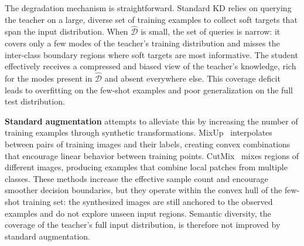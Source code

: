 \begin{foldable}
  The degradation mechanism is straightforward.
  Standard \ac{KD} relies on querying the teacher on a large, diverse set of training examples to collect soft targets that span the input distribution.
  When $\hat{\mathcal{D}}$ is small, the set of queries is narrow: it covers only a few modes of the teacher's training distribution and misses the inter-class boundary regions where soft targets are most informative.
  The student effectively receives a compressed and biased view of the teacher's knowledge, rich for the modes present in $\hat{\mathcal{D}}$ and absent everywhere else.
  This coverage deficit leads to overfitting on the few-shot examples and poor generalization on the full test distribution.
\end{foldable}

\begin{foldable}
  \textbf{Standard augmentation} attempts to alleviate this by increasing the number of training examples through synthetic transformations.
  MixUp~\cite{zhang2018mixup} interpolates between pairs of training images and their labels, creating convex combinations that encourage linear behavior between training points.
  CutMix~\cite{yun2019cutmix} mixes regions of different images, producing examples that combine local patches from multiple classes.
  These methods increase the effective sample count and encourage smoother decision boundaries, but they operate within the convex hull of the few-shot training set: the synthesized images are still anchored to the observed examples and do not explore unseen input regions.
  Semantic diversity, the coverage of the teacher's full input distribution, is therefore not improved by standard augmentation.
\end{foldable}

